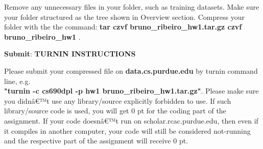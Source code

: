 \documentclass{article}
\newcommand{\homeworknumber}{1}
\begin{document}
Remove any unnecessary files in your folder, such as training datasets. Make sure your folder structured as the tree shown in Overview section. Compress your folder with the the command: \textbf{tar czvf bruno\_ribeiro\_hw\homeworknumber.tar.gz czvf bruno\_ribeiro\_hw\homeworknumber} .

\hfill

\noindent \textbf{Submit}: 
{\bf TURNIN INSTRUCTIONS}

Please submit your compressed file on \textbf{data.cs.purdue.edu} by turnin command line, e.g.\\ \textbf{"turnin -c cs690dpl -p hw\homeworknumber{} bruno\_ribeiro\_hw\homeworknumber.tar.gz"}.
Please make sure you didnâ€™t use any library/source explicitly forbidden to use. If such library/source code is used, you will get 0 pt for the coding part of the assignment. If your code doesnâ€™t run on scholar.rcac.purdue.edu, then even if it compiles in another computer, your code will still be considered not-running and the respective part of the assignment will receive 0 pt.



\end{document}

